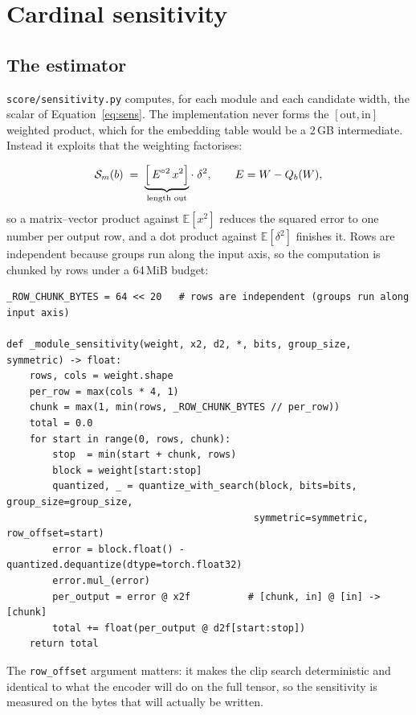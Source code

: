 \documentclass[11pt]{article}
\newcommand{\code}[1]{\texttt{#1}}
\begin{document}
\section{Cardinal sensitivity}
\label{sec:sens}

\subsection{The estimator}

\code{score/sensitivity.py} computes, for each module and each candidate width, the scalar of
Equation~\ref{eq:sens}. The implementation never forms the $[\text{out},\text{in}]$ weighted
product, which for the embedding table would be a 2\,GB intermediate. Instead it exploits that
the weighting factorises:

\begin{equation}
\mathcal{S}_m(b) \;=\; \underbrace{\Bigl[\,E^{\circ 2} \, x^2 \Bigr]}_{\text{length out}}
\cdot\; \delta^2 ,
\qquad E = W - Q_b(W),
\end{equation}
so a matrix--vector product against $\mathbb{E}[x^2]$ reduces the squared error to one number per
output row, and a dot product against $\mathbb{E}[\delta^2]$ finishes it. Rows are independent
because groups run along the input axis, so the computation is chunked by rows under a 64\,MiB
budget:

\begin{verbatim}
_ROW_CHUNK_BYTES = 64 << 20   # rows are independent (groups run along input axis)

def _module_sensitivity(weight, x2, d2, *, bits, group_size, symmetric) -> float:
    rows, cols = weight.shape
    per_row = max(cols * 4, 1)
    chunk = max(1, min(rows, _ROW_CHUNK_BYTES // per_row))
    total = 0.0
    for start in range(0, rows, chunk):
        stop  = min(start + chunk, rows)
        block = weight[start:stop]
        quantized, _ = quantize_with_search(block, bits=bits, group_size=group_size,
                                           symmetric=symmetric, row_offset=start)
        error = block.float() - quantized.dequantize(dtype=torch.float32)
        error.mul_(error)
        per_output = error @ x2f          # [chunk, in] @ [in] -> [chunk]
        total += float(per_output @ d2f[start:stop])
    return total
\end{verbatim}

The \code{row\_offset} argument matters: it makes the clip search deterministic and identical to
what the encoder will do on the full tensor, so the sensitivity is measured on the bytes that
will actually be written.
\end{document}

